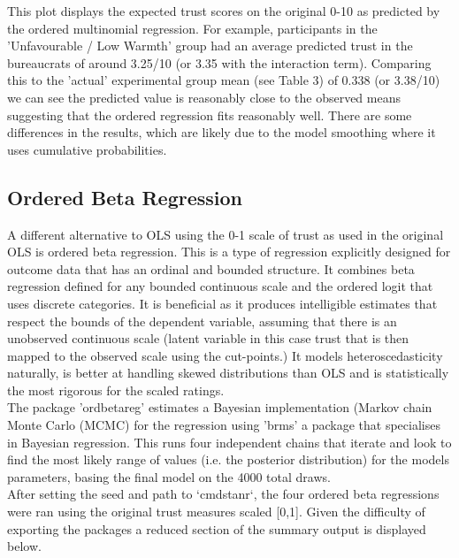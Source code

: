 \documentclass[12pt,letterpaper]{article}
\begin{document}
	This plot displays the expected trust scores on the original 0-10 as predicted by the ordered multinomial regression. 
	For example, participants in the 'Unfavourable / Low Warmth' group had an average predicted trust in the bureaucrats of around 3.25/10 (or 3.35 with the interaction term). Comparing this to the 'actual' experimental group mean (see Table 3) of 0.338 (or 3.38/10) we can see the predicted value is reasonably close to the observed means suggesting that the ordered regression fits reasonably well. There are some differences in the results, which are likely due to the model smoothing where it uses cumulative probabilities.  
		
\vspace{1cm}
		
\subsection{Ordered Beta Regression}
\vspace{0.5cm}
	A different alternative to OLS using the 0-1 scale of trust as used in the original OLS is ordered beta regression. This is a type of regression explicitly designed for outcome data that has an ordinal and bounded structure.  It combines beta regression defined for any bounded continuous scale and the ordered logit that uses discrete categories.  It is beneficial as it produces intelligible estimates that respect the bounds of the dependent variable, assuming that there is an unobserved continuous scale (latent variable in this case trust that is then mapped to the observed scale using the cut-points.)  It models heteroscedasticity naturally, is better at handling skewed distributions than OLS and is statistically the most rigorous for the scaled ratings. \\
	
	
	The package 'ordbetareg' estimates a Bayesian implementation (Markov chain Monte Carlo (MCMC) for the regression using 'brms' a package that specialises in Bayesian regression. This runs four independent chains that iterate and look to find the most likely range of values (i.e. the posterior distribution) for the models parameters, basing the final model on the 4000 total draws. \\
	
	
	
	After setting the seed and path to `cmdstanr`, the four ordered beta regressions were ran using the original trust measures scaled [0,1]. Given the difficulty of exporting the packages a reduced section of the summary output is displayed below.
	
\end{document}
